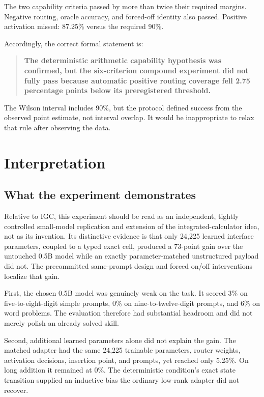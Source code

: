 \documentclass[11pt]{article}
\begin{document}
The two capability criteria passed by more than twice their required margins.
Negative routing, oracle accuracy, and forced-off identity also passed.
Positive activation missed: 87.25\% versus the required 90\%.

Accordingly, the correct formal statement is:

\begin{quote}
\textbf{The deterministic arithmetic capability hypothesis was confirmed,
but the six-criterion compound experiment did not fully pass because
automatic positive routing coverage fell 2.75 percentage points below its
preregistered threshold.}
\end{quote}

The Wilson interval includes 90\%, but the protocol defined success from the
observed point estimate, not interval overlap. It would be inappropriate to
relax that rule after observing the data.

\section{Interpretation}

\subsection{What the experiment demonstrates}

Relative to IGC, this experiment should be read as an independent, tightly
controlled small-model replication and extension of the integrated-calculator
idea, not as its invention. Its distinctive evidence is that only 24,225
learned interface parameters, coupled to a typed exact cell, produced a
73-point gain over the untouched 0.5B model while an exactly
parameter-matched unstructured payload did not. The precommitted same-prompt
design and forced on/off interventions localize that gain.

First, the chosen 0.5B model was genuinely weak on the task. It scored 3\% on
five-to-eight-digit simple prompts, 0\% on nine-to-twelve-digit prompts, and
6\% on word problems. The evaluation therefore had substantial headroom and
did not merely polish an already solved skill.

Second, additional learned parameters alone did not explain the gain. The
matched adapter had the same 24,225 trainable parameters, router weights,
activation decisions, insertion point, and prompts, yet reached only 5.25\%.
On long addition it remained at 0\%. The deterministic condition's exact state
transition supplied an inductive bias the ordinary low-rank adapter did not
recover.
\end{document}
